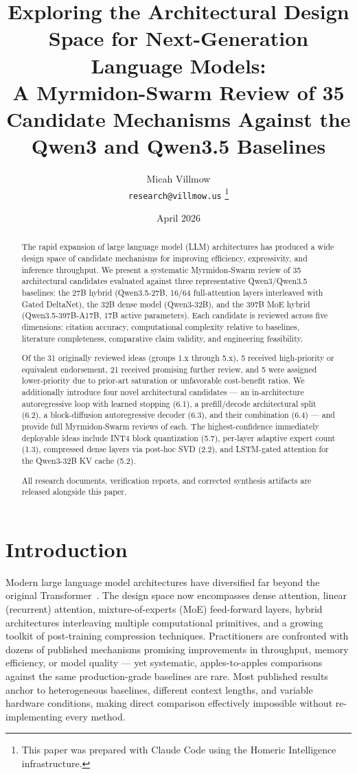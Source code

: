 \documentclass[11pt]{article}
\title{Exploring the Architectural Design Space for Next-Generation Language Models:\\
A Myrmidon-Swarm Review of 35 Candidate Mechanisms Against the Qwen3 and Qwen3.5 Baselines}
\author{
  Micah Villmow \\
  \texttt{research@villmow.us}
  \thanks{This paper was prepared with Claude Code using the Homeric Intelligence infrastructure.}
}
\date{April 2026}
\begin{document}
\maketitle

\begin{abstract}
The rapid expansion of large language model (LLM) architectures has produced a wide design space of candidate mechanisms for improving efficiency, expressivity, and inference throughput.
We present a systematic Myrmidon-Swarm review of 35 architectural candidates evaluated against three representative Qwen3/Qwen3.5 baselines: the 27B hybrid (Qwen3.5-27B, 16/64 full-attention layers interleaved with Gated DeltaNet), the 32B dense model (Qwen3-32B), and the 397B MoE hybrid (Qwen3.5-397B-A17B, 17B active parameters).
Each candidate is reviewed across five dimensions: citation accuracy, computational complexity relative to baselines, literature completeness, comparative claim validity, and engineering feasibility.

Of the 31 originally reviewed ideas (groups 1.x through 5.x), 5 received high-priority or equivalent endorsement, 21 received promising further review, and 5 were assigned lower-priority due to prior-art saturation or unfavorable cost-benefit ratios.
We additionally introduce four novel architectural candidates --- an in-architecture autoregressive loop with learned stopping (6.1), a prefill/decode architectural split (6.2), a block-diffusion autoregressive decoder (6.3), and their combination (6.4) --- and provide full Myrmidon-Swarm reviews of each.
The highest-confidence immediately deployable ideas include INT4 block quantization (5.7), per-layer adaptive expert count (1.3), compressed dense layers via post-hoc SVD (2.2), and LSTM-gated attention for the Qwen3-32B KV cache (5.2).

All research documents, verification reports, and corrected synthesis artifacts are released alongside this paper.
\end{abstract}

\section{Introduction}
\label{sec:intro}

Modern large language model architectures have diversified far beyond the original Transformer~\cite{Vaswani2017}.
The design space now encompasses dense attention, linear (recurrent) attention, mixture-of-experts (MoE) feed-forward layers, hybrid architectures interleaving multiple computational primitives, and a growing toolkit of post-training compression techniques.
Practitioners are confronted with dozens of published mechanisms promising improvements in throughput, memory efficiency, or model quality --- yet systematic, apples-to-apples comparisons against the same production-grade baselines are rare.
Most published results anchor to heterogeneous baselines, different context lengths, and variable hardware conditions, making direct comparison effectively impossible without re-implementing every method.
\end{document}
